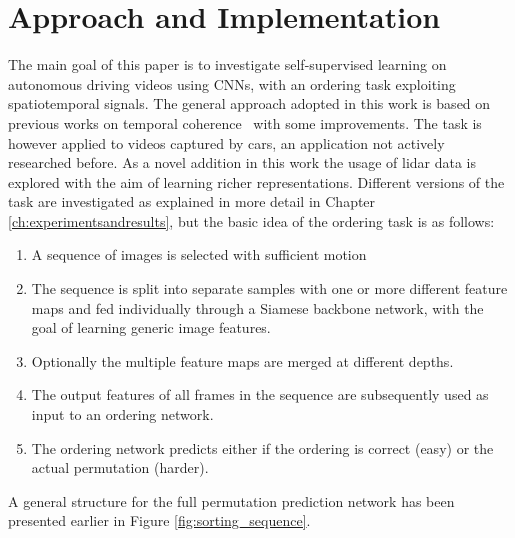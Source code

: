 %
\newpage
\chapter{Approach and Implementation}
\label{ch:approach_implementation}
The main goal of this paper is to investigate self-supervised learning on autonomous driving videos using CNNs, with an ordering task exploiting spatiotemporal signals. The general approach adopted in this work is based on previous works on temporal coherence~\cite{misra2016,lee2017} with some improvements. The task is however applied to videos captured by cars, an application not actively researched before. As a novel addition in this work the usage of lidar data is explored with the aim of learning richer representations. Different versions of the task are investigated as explained in more detail in Chapter \ref{ch:experimentsandresults}, but the basic idea of the ordering task is as follows:
\begin{enumerate}    
\item A sequence of images is selected with sufficient motion
\item The sequence is split into separate samples with one or more different feature maps and fed individually through a Siamese backbone network, with the goal of learning generic image features.
\item Optionally the multiple feature maps are merged at different depths.
\item The output features of all frames in the sequence are subsequently used as input to an ordering network.
\item The ordering network predicts either if the ordering is correct (easy)\cite{misra2016} or the actual permutation (harder)\cite{lee2017}.
\end{enumerate}
A general structure for the full permutation prediction network has been presented earlier in Figure \ref{fig:sorting_sequence}.

